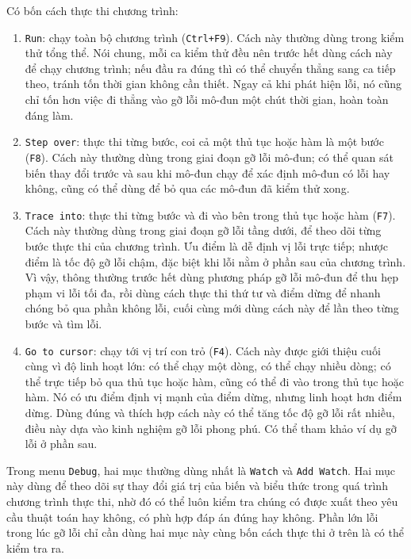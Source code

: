 \documentclass[11pt]{article}
\begin{document}
Có bốn cách thực thi chương trình:
\begin{enumerate}
  \item \texttt{Run}: chạy toàn bộ chương trình (\texttt{Ctrl+F9}). Cách này
  thường dùng trong kiểm thử tổng thể. Nói chung, mỗi ca kiểm thử đều nên
  trước hết dùng cách này để chạy chương trình; nếu đầu ra đúng thì có thể
  chuyển thẳng sang ca tiếp theo, tránh tốn thời gian không cần thiết. Ngay cả
  khi phát hiện lỗi, nó cũng chỉ tốn hơn việc đi thẳng vào gỡ lỗi mô-đun một
  chút thời gian, hoàn toàn đáng làm.

  \item \texttt{Step over}: thực thi từng bước, coi cả một thủ tục hoặc hàm
  là một bước (\texttt{F8}). Cách này thường dùng trong giai đoạn gỡ lỗi
  mô-đun; có thể quan sát biến thay đổi trước và sau khi mô-đun chạy để xác
  định mô-đun có lỗi hay không, cũng có thể dùng để bỏ qua các mô-đun đã kiểm
  thử xong.

  \item \texttt{Trace into}: thực thi từng bước và đi vào bên trong thủ tục
  hoặc hàm (\texttt{F7}). Cách này thường dùng trong giai đoạn gỡ lỗi tầng
  dưới, để theo dõi từng bước thực thi của chương trình. Ưu điểm là dễ định
  vị lỗi trực tiếp; nhược điểm là tốc độ gỡ lỗi chậm, đặc biệt khi lỗi nằm ở
  phần sau của chương trình. Vì vậy, thông thường trước hết dùng phương pháp
  gỡ lỗi mô-đun để thu hẹp phạm vi lỗi tối đa, rồi dùng cách thực thi thứ tư
  và điểm dừng để nhanh chóng bỏ qua phần không lỗi, cuối cùng mới dùng cách
  này để lần theo từng bước và tìm lỗi.

  \item \texttt{Go to cursor}: chạy tới vị trí con trỏ (\texttt{F4}). Cách
  này được giới thiệu cuối cùng vì độ linh hoạt lớn: có thể chạy một dòng, có
  thể chạy nhiều dòng; có thể trực tiếp bỏ qua thủ tục hoặc hàm, cũng có thể
  đi vào trong thủ tục hoặc hàm. Nó có ưu điểm định vị mạnh của điểm dừng,
  nhưng linh hoạt hơn điểm dừng. Dùng đúng và thích hợp cách này có thể tăng
  tốc độ gỡ lỗi rất nhiều, điều này dựa vào kinh nghiệm gỡ lỗi phong phú. Có
  thể tham khảo ví dụ gỡ lỗi ở phần sau.
\end{enumerate}

Trong menu \texttt{Debug}, hai mục thường dùng nhất là \texttt{Watch} và
\texttt{Add Watch}. Hai mục này dùng để theo dõi sự thay đổi giá trị của biến
và biểu thức trong quá trình chương trình thực thi, nhờ đó có thể luôn kiểm
tra chúng có được xuất theo yêu cầu thuật toán hay không, có phù hợp đáp án
đúng hay không. Phần lớn lỗi trong lúc gỡ lỗi chỉ cần dùng hai mục này cùng
bốn cách thực thi ở trên là có thể kiểm tra ra.
\end{document}
